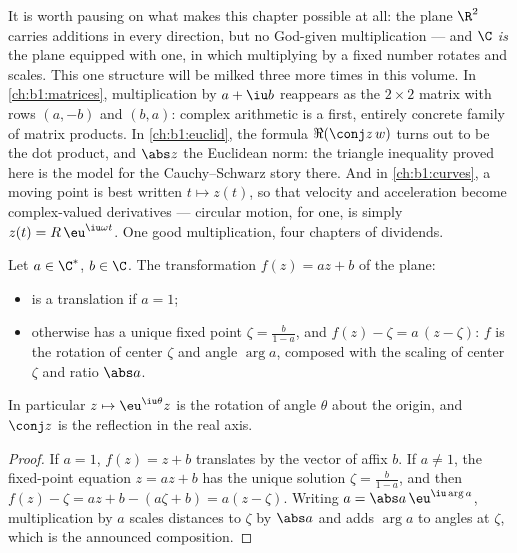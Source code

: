 \begin{remark}\label{rem:b1:complex:interlude}
It is worth pausing on what makes this chapter possible at all:
the plane $\R^2$ carries additions in every direction, but no
God-given multiplication --- and $\C$ \emph{is} the plane
equipped with one, in which multiplying by a fixed number
rotates and scales. This one structure will be milked three more
times in this volume. In \cref{ch:b1:matrices}, multiplication by
$a + \iu b$ reappears as the $2 \times 2$ matrix with rows $(a,
-b)$ and $(b, a)$: complex arithmetic is a first, entirely
concrete family of matrix products. In \cref{ch:b1:euclid}, the
formula $\Re(\conj z\,w)$ turns out to be the dot product, and
$\abs z$ the Euclidean norm: the triangle inequality proved here
is the model for the Cauchy--Schwarz story there. And in
\cref{ch:b1:curves}, a moving point is best written $t \mapsto
z(t)$, so that velocity and acceleration become complex-valued
derivatives --- circular motion, for one, is simply $z(t) =
R\,\eu^{\iu\omega t}$. One good multiplication, four chapters of
dividends.
\end{remark}

\begin{proposition}\label{prop:b1:complex:similitude}
Let $a \in \C^*$, $b \in \C$. The transformation $f(z) = az + b$ of
the plane:
\begin{itemize}
  \item is a translation if $a = 1$;
  \item otherwise has a unique fixed point $\zeta = \frac{b}{1-a}$,
        and $f(z) - \zeta = a\,(z - \zeta)$: $f$ is the rotation of
        center $\zeta$ and angle $\arg a$, composed with the scaling
        of center $\zeta$ and ratio $\abs a$.
\end{itemize}
In particular $z \mapsto \eu^{\iu\theta} z$ is the rotation of angle
$\theta$ about the origin, and $\conj z$ is the reflection in the real
axis.
\end{proposition}

\begin{proof}
If $a = 1$, $f(z) = z + b$ translates by the vector of affix $b$. If
$a \neq 1$, the fixed-point equation $z = az + b$ has the unique
solution $\zeta = \frac{b}{1-a}$, and then $f(z) - \zeta = az + b -
(a\zeta + b) = a(z - \zeta)$. Writing $a = \abs a\, \eu^{\iu\arg a}$,
multiplication by $a$ scales distances to $\zeta$ by $\abs a$ and adds
$\arg a$ to angles at $\zeta$, which is the announced composition.
\end{proof}


